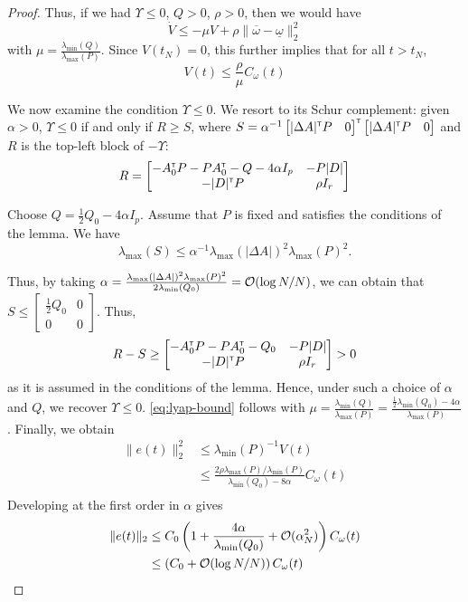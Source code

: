 \begin{subappendices}
\begin{proof}
		Thus, if we had $\Upsilon \leq 0$, $Q>0$, $\rho > 0$, then we would have
		\[
		\dot{V} \leq -\mu V + \rho \|\overline{\omega} - \underline{\omega}\|_2^2
		\]
		with $\mu = \frac{\lambda_{\min}(Q)}{\lambda_{\max}(P)}$. Since $V(t_N) = 0$, this further implies that for all $t>t_N$, 
		\begin{equation}
		\label{eq:lyap-bound}
		V(t) \leq \frac{\rho}{\mu} C_\omega(t)
		\end{equation}
		
		We now examine the condition $\Upsilon \leq 0$.
		We resort to its Schur complement: given $\alpha > 0$, $\Upsilon \leq 0$ if and only if $R \geq S$, where $S= \alpha^{-1}\begin{bmatrix}|\Delta A|^{\mathsf{\scriptscriptstyle T}} P & 0\end{bmatrix}^{\mathsf{\scriptscriptstyle T}} \begin{bmatrix}|\Delta A|^{\mathsf{\scriptscriptstyle T}} P & 0\end{bmatrix}$ and $R$ is the top-left block of $-\Upsilon$:
		\[R = \begin{bmatrix}
		-A_0^{\mathsf{\scriptscriptstyle T}} P - P A_0^{\mathsf{\scriptscriptstyle T}} - Q - 4\alpha I_p & -P|D|\\
		-|D|^{\mathsf{\scriptscriptstyle T}} P & \rho I_r\\
		\end{bmatrix}\]
		
		Choose $Q = \frac{1}{2}Q_0-4\alpha I_p$.
		Assume that $P$ is fixed and satisfies the conditions of the lemma. We have $$\lambda_{\max}(S) \leq \alpha^{-1}\lambda_{\max}(|\Delta A|)^2\lambda_{\max}(P)^2.$$
		
		Thus, by taking $\alpha = \frac{\lambda_{\max}(|\Delta A|)^2\lambda_{\max}(P)^2}{2\lambda_{\min}(Q_0)} = \mathcal{O}(\log N / N)$, we can obtain that $S \leq \begin{bmatrix}
		\frac{1}{2}Q_0 & 0\\0 & 0
		\end{bmatrix}$. Thus,
		\[R-S \geq \begin{bmatrix}
		-A_0^{\mathsf{\scriptscriptstyle T}} P - P A_0^{\mathsf{\scriptscriptstyle T}} - Q_0 & -P|D|\\
		-|D|^{\mathsf{\scriptscriptstyle T}} P & \rho I_r\\
		\end{bmatrix} > 0 \]
		as it is assumed in the conditions of the lemma. Hence, under such a choice of $\alpha$ and $Q$, we recover $\Upsilon\leq 0$. \eqref{eq:lyap-bound} follows with $\mu = \frac{\lambda_{\min}(Q)}{\lambda_{\max}(P)} = \frac{\frac{1}{2}\lambda_{\min}(Q_0) - 4\alpha}{\lambda_{\max}(P)}$.
		Finally, we obtain
		\begin{align*}
		\|e(t)\|_2^2 &\leq \lambda_{\min}(P)^{-1} V(t)\\
		& \leq \frac{2\rho\lambda_{\max}(P)/\lambda_{\min}(P)}{\lambda_{\min}(Q_0) - 8\alpha} C_\omega(t)\\
		\end{align*}
		Developing at the first order in $\alpha$ gives
		\begin{align*}
		\|e(t)\|_2 &\leq C_0\left(1 + \frac{4\alpha}{\lambda_{\min}(Q_0)} + \mathcal{O}(\alpha_N^2)\right)C_\omega(t)\\
		&\leq \left(C_0 + \mathcal{O}(\log N/N)\right)C_\omega(t)
		\end{align*}
	\end{proof}
	

\end{subappendices}
